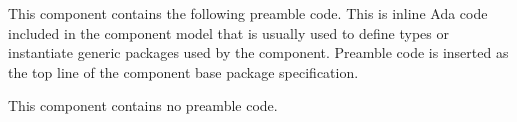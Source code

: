 This component contains the following preamble code. This is inline Ada code included in the component model that is usually used to define types or instantiate generic packages used by the component. Preamble code is inserted as the top line of the component base package specification.

\begin{adacode}
\end{adacode}
This component contains no preamble code.
